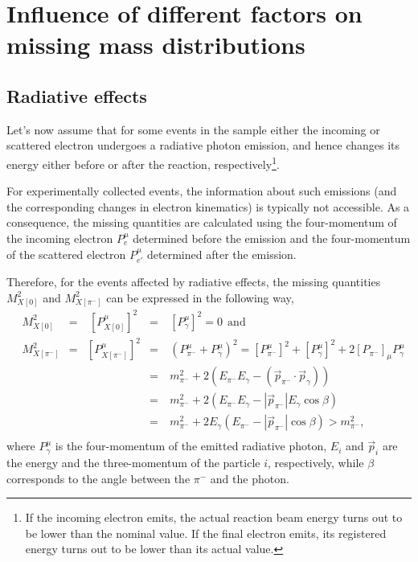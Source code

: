 \newpage
\chapter{Influence of different factors on missing mass distributions}
\section{Radiative effects}
\mbox{}\vspace{-\baselineskip}

Let's now assume that for some events in the sample either the incoming or scattered electron undergoes a radiative photon emission, and hence changes its energy either before or after the reaction, respectively\footnote[2]{If the incoming electron emits, the actual reaction beam energy turns out to be lower than the nominal value. If the final electron emits, its registered energy turns out to be lower than its actual value.}. 

For experimentally collected events, the information about such emissions (and the corresponding changes in electron kinematics) is typically not accessible. As a consequence, the missing quantities are calculated using the four-momentum of the incoming electron $P_{e}^{\mu}$ determined before the emission and the four-momentum of the scattered electron $P_{e'}^{\mu}$ determined after the emission.


Therefore, for the events affected by radiative effects, the missing quantities $M_{X[0]}^{2}$ and $M_{X[\pi^{-}]}^{2}$ can be expressed in the following way,\vspace{-0.125em}
\begin{equation}
\begin{aligned}
&M_{X[0]}^{2}&=&~\left [P_{X[0]}^{\mu} \right ]^{2}&=&~[P^{\mu}_{\gamma}]^{2}=0~~\textrm{and}\\[8pt]
&M_{X[\pi^{-}]}^{2}&=&\left [P_{X[\pi^{-}]}^{\mu}\right ]^{2}&=&~(P_{\pi^{-}}^{\mu}+P^{\mu}_{\gamma})^{2}=[P^{\mu}_{\pi^{-}}]^{2} +[P^{\mu}_{\gamma}]^{2}+2\left [P_{\pi^{-}}\right ]_{\mu} P_{\gamma}^{\mu} \\
&&&&=&~m_{\pi^{-}}^{2} +2(E_{\pi^{-}}E_{\gamma} - (\overrightarrow{p}_{\pi^{-}}\cdot \overrightarrow{p}_{\gamma}))  \\
&&&&=&~m_{\pi^{-}}^{2} +2(E_{\pi^{-}}E_{\gamma} - |\overrightarrow{p}_{\pi^{-}}|E_{\gamma}\cos\beta) \\
&&&&=&~ m_{\pi^{-}}^{2} +2E_{\gamma}(E_{\pi^{-}} -|\overrightarrow{p}_{\pi^{-}}|\cos\beta ) >m_{\pi^{-}}^{2}   ,\\
\end{aligned}\label{eq:mm_rad}
\end{equation}
where $P^{\mu}_{\gamma}$ is the four-momentum of the emitted radiative photon, $E_{i}$ and $\overrightarrow{p}_{i}$ are the energy and the three-momentum of the particle $i$, respectively, while $\beta$ corresponds to the angle between the $\pi^{-}$ and the photon.


